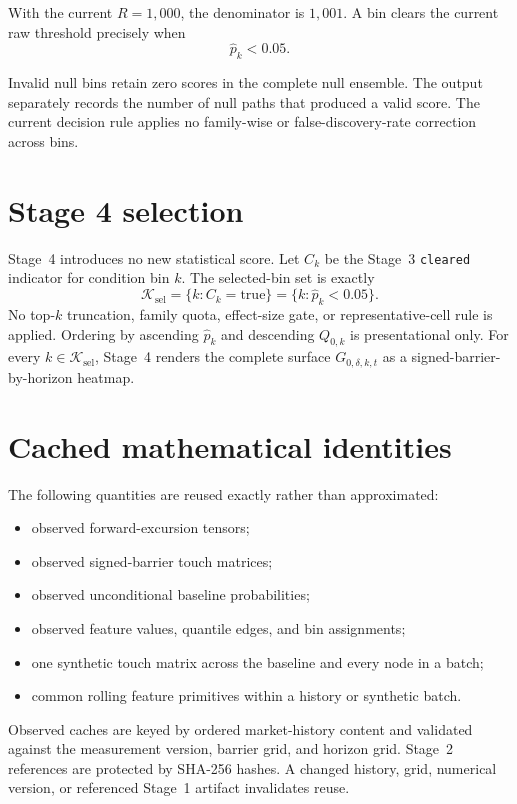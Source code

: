 \documentclass[11pt]{article}
\begin{document}
With the current $R=1{,}000$, the denominator is $1{,}001$. A bin clears the
current raw threshold precisely when
\begin{equation}
\widehat p_k<0.05.
\end{equation}

Invalid null bins retain zero scores in the complete null ensemble. The output
separately records the number of null paths that produced a valid score. The
current decision rule applies no family-wise or false-discovery-rate correction
across bins.

\section{Stage 4 selection}

Stage~4 introduces no new statistical score. Let $C_k$ be the Stage~3
\texttt{cleared} indicator for condition bin $k$. The selected-bin set is exactly
\begin{equation}
\mathcal K_{\mathrm{sel}}
=\{k:C_k=\mathrm{true}\}=\{k:\widehat p_k<0.05\}.
\end{equation}
No top-$k$ truncation, family quota, effect-size gate, or representative-cell
rule is applied. Ordering by ascending $\widehat p_k$ and descending $Q_{0,k}$
is presentational only. For every $k\in\mathcal K_{\mathrm{sel}}$, Stage~4
renders the complete surface $G_{0,\delta,k,t}$ as a
signed-barrier-by-horizon heatmap.

\section{Cached mathematical identities}

The following quantities are reused exactly rather than approximated:
\begin{itemize}[nosep]
  \item observed forward-excursion tensors;
  \item observed signed-barrier touch matrices;
  \item observed unconditional baseline probabilities;
  \item observed feature values, quantile edges, and bin assignments;
  \item one synthetic touch matrix across the baseline and every node in a batch;
  \item common rolling feature primitives within a history or synthetic batch.
\end{itemize}

Observed caches are keyed by ordered market-history content and validated
against the measurement version, barrier grid, and horizon grid. Stage~2
references are protected by SHA-256 hashes. A changed history, grid, numerical
version, or referenced Stage~1 artifact invalidates reuse.
\end{document}
